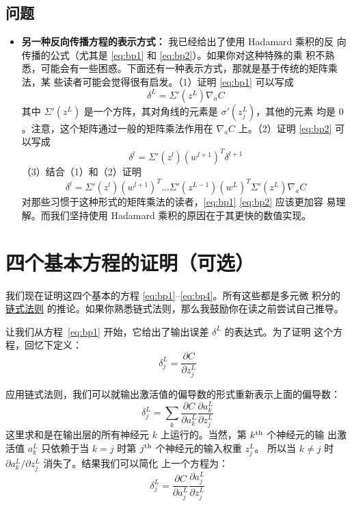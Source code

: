 \subsection*{问题}

\begin{itemize}
\item \textbf{另一种反向传播方程的表示方式：} 我已经给出了使用 Hadamard 乘积的反
  向传播的公式（尤其是 \eqref{eq:bp1} 和 \eqref{eq:bp2}）。如果你对这种特殊的乘
  积不熟悉，可能会有一些困惑。下面还有一种表示方式，那就是基于传统的矩阵乘法，某
  些读者可能会觉得很有启发。（1）证明 \eqref{eq:bp1} 可以写成
  \begin{equation}
    \delta^L = \Sigma'(z^L) \nabla_a C
    \label{eq:33}\tag{33}
  \end{equation}
  其中 $\Sigma'(z^L)$ 是一个方阵，其对角线的元素是 $\sigma'(z_j^L)$，其他的元素
  均是 $0$。注意，这个矩阵通过一般的矩阵乘法作用在 $\nabla_a C$ 上。（2）证明
  \eqref{eq:bp2} 可以写成
  \begin{equation}
    \delta^l = \Sigma'(z^l) (w^{l+1})^T \delta^{l+1}
    \label{eq:34}\tag{34}
  \end{equation}
  （3）结合（1）和（2）证明
  \begin{equation}
    \delta^l = \Sigma'(z^l) (w^{l+1})^T \ldots \Sigma'(z^{L-1}) (w^L)^T
    \Sigma'(z^L) \nabla_a C
    \label{eq:35}\tag{35}
  \end{equation}
  对那些习惯于这种形式的矩阵乘法的读者，\eqref{eq:bp1} \eqref{eq:bp2} 应该更加容
  易理解。而我们坚持使用 Hadamard 乘积的原因在于其更快的数值实现。
\end{itemize}

\section{四个基本方程的证明（可选）}
\label{sec:proof_of_the_four_fundamental_equations}

我们现在证明这四个基本的方程 \eqref{eq:bp1}--\eqref{eq:bp4}。所有这些都是多元微
积分的\href{https://en.wikipedia.org/wiki/Chain_rule}{链式法则}%
的推论。如果你熟悉链式法则，那么我鼓励你在读之前尝试自己推导。

让我们从方程~\eqref{eq:bp1} 开始，它给出了输出误差 $\delta^L$ 的表达式。为了证明
这个方程，回忆下定义：
\begin{equation}
  \delta^L_j = \frac{\partial C}{\partial z^L_j}
\label{eq:36}\tag{36}
\end{equation}

应用链式法则，我们可以就输出激活值的偏导数的形式重新表示上面的偏导数：
\begin{equation}
  \delta^L_j = \sum_k \frac{\partial C}{\partial a^L_k} \frac{\partial a^L_k}{\partial z^L_j}
\label{eq:37}\tag{37}
\end{equation}
这里求和是在输出层的所有神经元 $k$ 上运行的。当然，第 $k^{\rm th}$ 个神经元的输
出激活值 $a^L_k$ 只依赖于当 $k=j$ 时第 $j^{\rm th}$ 个神经元的输入权重 $z^L_j$。
所以当 $k \neq j$ 时 $\partial a^L_k / \partial z^L_j$ 消失了。结果我们可以简化
上一个方程为：
\begin{equation}
  \delta^L_j = \frac{\partial C}{\partial a^L_j} \frac{\partial a^L_j}{\partial z^L_j}
\label{eq:38}\tag{38}
\end{equation}

